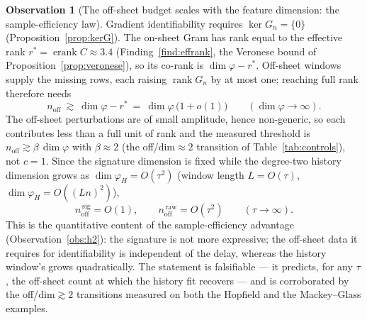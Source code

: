 \documentclass[11pt]{article}
\renewcommand{\_}{\discretionary{\textunderscore}{}{\textunderscore}}
\theoremstyle{plain}
\theoremstyle{definition}
\newtheorem{observation}[theorem]{Observation}
\newcommand{\rank}{\operatorname{rank}}
\newcommand{\effrank}{\operatorname{erank}}
\begin{document}
\begin{observation}[The off-sheet budget scales with the feature dimension: the sample-efficiency law]\label{obs:budget}
Gradient identifiability requires $\ker G_n=\{0\}$ (Proposition~\ref{prop:kerG}). The on-sheet
Gram has rank equal to the effective rank $r^\ast=\effrank C\approx 3.4$
(Finding~\ref{find:effrank}, the Veronese bound of Proposition~\ref{prop:veronese}), so its
co-rank is $\dim\varphi-r^\ast$. Off-sheet windows supply the missing rows, each raising
$\rank G_n$ by at most one; reaching full rank therefore needs
\[
  n_{\mathrm{off}}\ \gtrsim\ \dim\varphi-r^\ast\ =\ \dim\varphi\,\bigl(1+o(1)\bigr)
  \qquad (\dim\varphi\to\infty).
\]
The off-sheet perturbations are of small amplitude, hence non-generic, so each contributes less
than a full unit of rank and the measured threshold is $n_{\mathrm{off}}\gtrsim \beta\,\dim\varphi$ with
$\beta\approx 2$ (the off/dim${}\approx 2$ transition of Table~\ref{tab:controls}), not $c=1$.
Since the signature dimension is fixed while the degree-two history dimension grows as
$\dim\varphi_H=O(\tau^{2})$ (window length $L=O(\tau)$, $\dim\varphi_H=O((Ln)^{2})$),
\[
  n_{\mathrm{off}}^{\,\mathrm{sig}}=O(1),\qquad
  n_{\mathrm{off}}^{\,\mathrm{raw}}=O(\tau^{2})\qquad (\tau\to\infty).
\]
This is the quantitative content of the sample-efficiency advantage (Observation~\ref{obs:h2}):
the signature is not more expressive; the off-sheet data it requires for identifiability is
independent of the delay, whereas the history window's grows quadratically. The statement is
falsifiable --- it predicts, for any $\tau$, the off-sheet count at which the history fit
recovers --- and is corroborated by the off/dim${}\gtrsim 2$ transitions measured on both the
Hopfield and the Mackey--Glass examples.
\end{observation}
\end{document}
